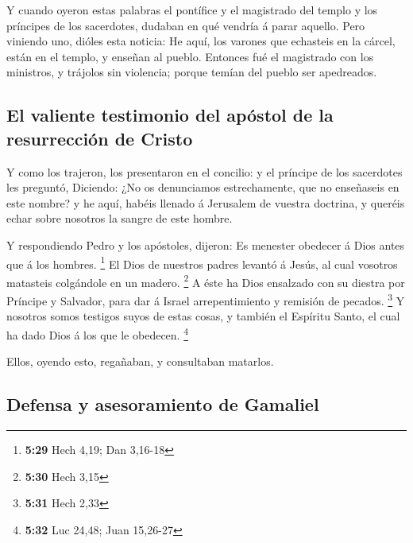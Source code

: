  Y cuando oyeron estas palabras el pontífice y el
magistrado del templo y los príncipes de los sacerdotes, dudaban en qué
vendría á parar aquello.  Pero viniendo uno, dióles esta
noticia: He aquí, los varones que echasteis en la cárcel, están en el
templo, y enseñan al pueblo.  Entonces fué el magistrado
con los ministros, y trájolos sin violencia; porque temían del pueblo
ser apedreados.

\hypertarget{el-valiente-testimonio-del-apuxf3stol-de-la-resurrecciuxf3n-de-cristo}{%
\subsection{El valiente testimonio del apóstol de la resurrección de
Cristo}\label{el-valiente-testimonio-del-apuxf3stol-de-la-resurrecciuxf3n-de-cristo}}

 Y como los trajeron, los presentaron en el concilio: y
el príncipe de los sacerdotes les preguntó,  Diciendo:
¿No os denunciamos estrechamente, que no enseñaseis en este nombre? y he
aquí, habéis llenado á Jerusalem de vuestra doctrina, y queréis echar
sobre nosotros la sangre de este hombre.

 Y respondiendo Pedro y los apóstoles, dijeron: Es
menester obedecer á Dios antes que á los hombres. \footnote{\textbf{5:29}
  Hech 4,19; Dan 3,16-18}  El Dios de nuestros padres
levantó á Jesús, al cual vosotros matasteis colgándole en un madero.
\footnote{\textbf{5:30} Hech 3,15}  A éste ha Dios
ensalzado con su diestra por Príncipe y Salvador, para dar á Israel
arrepentimiento y remisión de pecados. \footnote{\textbf{5:31} Hech 2,33}
 Y nosotros somos testigos suyos de estas cosas, y
también el Espíritu Santo, el cual ha dado Dios á los que le obedecen.
\footnote{\textbf{5:32} Luc 24,48; Juan 15,26-27}

 Ellos, oyendo esto, regañaban, y consultaban matarlos.

\hypertarget{defensa-y-asesoramiento-de-gamaliel}{%
\subsection{Defensa y asesoramiento de
Gamaliel}\label{defensa-y-asesoramiento-de-gamaliel}}

